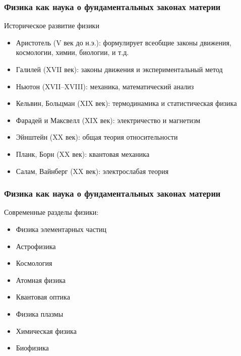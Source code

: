 \begin{frame}
    \frametitle{Физика как наука о фундаментальных законах материи}
    Историческое развитие физики
    \begin{itemize}[<+->]
        \item Аристотель (V век до н.э.): формулирует всеобщие законы
            движения, космологии, химии, биологии, и т.д.
        \item Галилей (XVII век): законы движения и экспериментальный
            метод
        \item Ньютон (XVII--XVIII): механика, математический анализ
        \item Кельвин, Больцман (XIX век): термодинамика и
            статистическая физика
        \item Фарадей и Максвелл (XIX век): электричество и магнетизм
        \item Эйнштейн (XX век): общая теория относительности
        \item Планк, Борн (XX век): квантовая механика
        \item Салам, Вайнберг (XX век): электрослабая теория
    \end{itemize}
\end{frame}
\begin{frame}
    \frametitle{Физика как наука о фундаментальных законах материи}
    Современные разделы физики:
    \begin{itemize}[<+->]
        \item Физика элементарных частиц
        \item Астрофизика
        \item Космология
        \item Атомная физика
        \item Квантовая оптика
        \item Физика плазмы
        \item Химическая физика
        \item Биофизика
    \end{itemize}
\end{frame}

